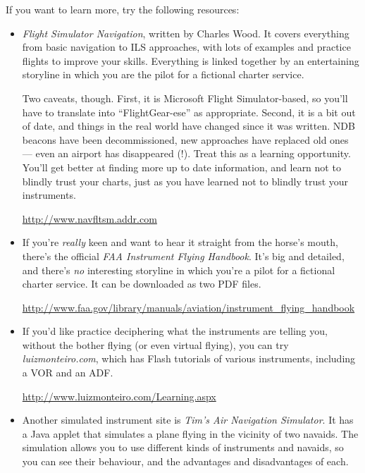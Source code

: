 If you want to learn more, try the following resources:

\begin{itemize}
\item \textit{Flight Simulator Navigation}, written by Charles Wood.
  It covers everything from basic navigation to ILS approaches, with
  lots of examples and practice flights to improve your skills.
  Everything is linked together by an entertaining storyline in which
  you are the pilot for a fictional charter service.

  Two caveats, though.  First, it is Microsoft Flight Simulator-based,
  so you'll have to translate into ``FlightGear-ese'' as appropriate.
  Second, it is a bit out of date, and things in the real world have
  changed since it was written.  NDB beacons have been decommissioned,
  new approaches have replaced old ones --- even an airport has
  disappeared (!).  Treat this as a learning opportunity.  You'll get
  better at finding more up to date information, and learn not to
  blindly trust your charts, just as you have learned not to blindly
  trust your instruments.

  \url{http://www.navfltsm.addr.com}

\item If you're \emph{really} keen and want to hear it straight from
  the horse's mouth, there's the official \textit{FAA Instrument
    Flying Handbook}.  It's big and detailed, and there's \emph{no}
  interesting storyline in which you're a pilot for a fictional
  charter service.  It can be downloaded as two PDF files.

  \url{http://www.faa.gov/library/manuals/aviation/instrument_flying_handbook}

\item If you'd like practice deciphering what the instruments are
  telling you, without the bother flying (or even virtual flying), you
  can try \textit{luizmonteiro.com}, which has Flash tutorials of
  various instruments, including a VOR and an ADF.

  \url{http://www.luizmonteiro.com/Learning.aspx}

\item Another simulated instrument site is \textit{Tim's Air
  Navigation Simulator}.  It has a Java applet that simulates a plane
  flying in the vicinity of two navaids.  The simulation allows you to
  use different kinds of instruments and navaids, so you can see their
  behaviour, and the advantages and disadvantages of each.


\end{itemize}
